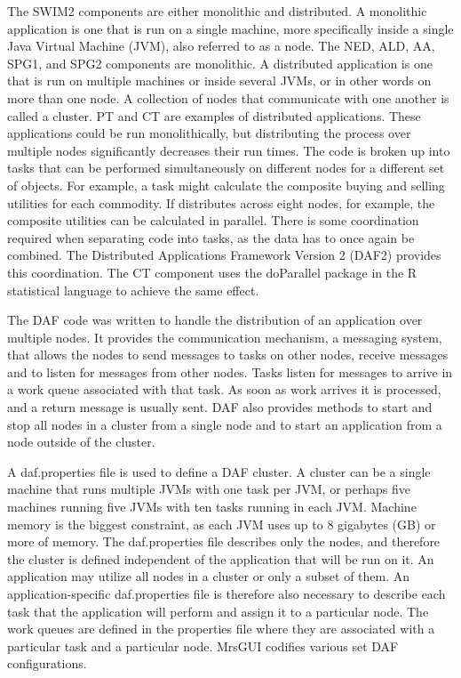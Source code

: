 \noindent The SWIM2 components are either monolithic and distributed. A monolithic application is one that is run on a single machine, more specifically inside a single Java Virtual Machine (JVM), also referred to as a node. The NED, ALD, AA, SPG1, and SPG2 components are monolithic. A distributed application is one that is run on multiple machines or inside several JVMs, or in other words on more than one node. A collection of nodes that communicate with one another is called a cluster. PT and CT are examples of distributed applications. These applications could be run monolithically, but distributing the process over multiple nodes significantly decreases their run times. The code is broken up into tasks that can be performed simultaneously on different nodes for a different set of objects. For example, a task might calculate the composite buying and selling utilities for each commodity. If distributes across eight nodes, for example, the composite utilities can be calculated in parallel. There is some coordination required when separating code into tasks, as the data has to once again be combined. The Distributed Applications Framework Version 2 (DAF2) provides this coordination. The CT component uses the doParallel package in the R statistical language to achieve the same effect.

The DAF code was written to handle the distribution of an application over multiple nodes. It provides the communication mechanism, a messaging system, that allows the nodes to send messages to tasks on other nodes, receive messages and to listen for messages from other nodes. Tasks listen for messages to arrive in a work queue associated with that task. As soon as work arrives it is processed, and a return message is usually sent. DAF also provides methods to start and stop all nodes in a cluster from a single node and to start an application from a node outside of the cluster. 

A daf.properties file is used to define a DAF cluster. A cluster can be a single machine that runs multiple JVMs with one task per JVM, or perhaps five machines running five JVMs with ten tasks running in each JVM. Machine memory is the biggest constraint, as each JVM uses up to 8 gigabytes (GB) or more of memory. The daf.properties file describes only the nodes, and therefore the cluster is defined independent of the application that will be run on it. An application may utilize all nodes in a cluster or only a subset of them. An application-specific daf.properties file is therefore also necessary to describe each task that the application will perform and assign it to a particular node. The work queues are defined in the properties file where they are associated with a particular task and a particular node. MrsGUI codifies various set DAF configurations.

